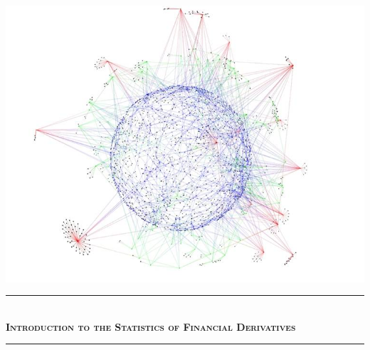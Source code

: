 \documentclass[12pt]{article}
\begin{document}
\begin{titlepage} %
	\newcommand{\HRule}{\rule{\linewidth}{0.5mm}} %
	
	
	
	\center %
	
	
	\includegraphics[scale=1]{PPI.jpg}\\[1cm]
	
	
	
	
	\HRule\\[0.5cm]
	
	\huge \textsc{\textbf{Introduction to the Statistics of Financial Derivatives}}\\[0.01cm] %
	
	\HRule\\[1.0cm]
	

\end{titlepage}
\end{document}
